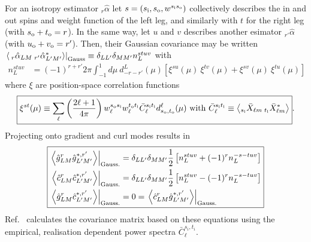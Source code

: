 \documentclass{article}
\newcommand{\si}[0]{{s_{\rm i}}}
\newcommand{\ti}[0]{{t_{\rm i}}}
\newcommand{\so}[0]{{s_{\rm o}}}
\renewcommand{\to}[0]{{t_{\rm o}}}
\newcommand{\uo}[0]{{u_{\rm o}}}
\newcommand{\vo}[0]{{v_{\rm o}}}
\newcommand{\av}[1]{\left\langle #1 \right\rangle}
\begin{document}
For an isotropy estimator $_{r}\hat \alpha$ let $s = (\si, \so, w^{\si\so})$ collectively describes the in and out spins and weight function of the left leg, and similarly with $t$ for the right leg (with $\so + \to = r$). In the same way, let $u$ and $v$ describes another esimator $_{r'}\hat \alpha$ (with $\uo + \vo = r'$). Then, their Gaussian covariance may be written $ \left.\av{\:_{r}\hat \alpha_{LM}\: _{r'}\hat \alpha^*_{L'M'}} \right|_{\rm Gauss} \equiv \delta_{LL'}\delta_{MM'}n_L^{stuv}$ with
\begin{equation}
\boxed{
\begin{split} 
n_L^{stuv} & = (-1)^{r + r'}2\pi  \int_{-1}^1 d \mu\:  d^L_{-r -r'}(\mu) \left[\xi^{su}(\mu)\:\xi^{tv}(\mu)  + \xi^{sv}(\mu)\:\xi^{tu}(\mu) \right]
\end{split}}
\end{equation}
where $\xi$ are position-space correlation functions
\begin{equation}\boxed{
\xi^{st}(\mu) \equiv  \sum_\ell \left(\frac{2\ell + 1}{4\pi}\right)w^{\so\si}_\ell w^{\to\ti}_\ell \bar C_\ell^{\si \ti} d^\ell_{\so,\to}(\mu)\textrm{ with } \bar C_\ell^{\si \ti} \equiv \av{ _{\si}\bar X_{\ell m}\: _{\ti} \bar X^*_{\ell m} }}.
\end{equation}
Projecting onto gradient and curl modes results in
\begin{equation} \boxed{
\begin{split}
\left.\av{\hat g^{r}_{LM} \hat g^{*, r'}_{L' M'} }\right|_{\rm Gauss.} &=\delta_{LL'}\delta_{MM'} \frac 12\left[n_L^{stuv} +  (-1)^{r} n^{-s-tuv}_L\right] \\
		\left.\av{\hat c^{r}_{LM} \hat c^{*, r'}_{L' M'} }\right|_{\rm Gauss.} &= \delta_{LL'}\delta_{MM'}\frac 12\left[n_L^{stuv} -  (-1)^{r} n^{-s-tuv}_L\right]\\
	\left.\av{\hat g^{r}_{LM} \hat c^{*, r'}_{L' M'} }\right|_{\rm Gauss.} &=0 = \left.\av{\hat c^{r}_{LM} \hat g^{*, r'}_{L' M'} }\right|_{\rm Gauss.}
\end{split}}
\end{equation}
Ref.~\cite{Aghanim:2018oex} calculates the covariance matrix based on these equations using the empirical, realisation dependent power spectra $\bar C_\ell^{s_i,t_i}$.
\end{document}
